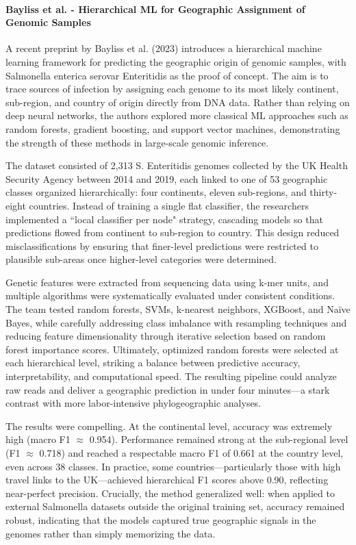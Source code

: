 \documentclass[twocolumn,10pt]{article}
\begin{document}
\paragraph{Bayliss et al. - Hierarchical ML for Geographic Assignment of Genomic Samples}

A recent preprint by Bayliss et al. (2023) \citep{bayliss2022hierarchical} introduces a hierarchical
machine learning framework for predicting the geographic origin of genomic samples, with Salmonella
enterica serovar Enteritidis as the proof of concept. The aim is to trace sources of infection by
assigning each genome to its most likely continent, sub-region, and country of origin directly from
DNA data. Rather than relying on deep neural networks, the authors explored more classical ML
approaches such as random forests, gradient boosting, and support vector machines, demonstrating the
strength of these methods in large-scale genomic inference.

The dataset consisted of 2,313 S. Enteritidis genomes collected by the UK Health Security Agency
between 2014 and 2019, each linked to one of 53 geographic classes organized hierarchically: four
continents, eleven sub-regions, and thirty-eight countries. Instead of training a single flat
classifier, the researchers implemented a ``local classifier per node" strategy, cascading models so
that predictions flowed from continent to sub-region to country. This design reduced
misclassifications by ensuring that finer-level predictions were restricted to plausible sub-areas
once higher-level categories were determined.

Genetic features were extracted from sequencing data using k-mer units, and multiple algorithms were
systematically evaluated under consistent conditions. The team tested random forests, SVMs,
k-nearest neighbors, XGBoost, and Naïve Bayes, while carefully addressing class imbalance with
resampling techniques and reducing feature dimensionality through iterative selection based on
random forest importance scores. Ultimately, optimized random forests were selected at each
hierarchical level, striking a balance between predictive accuracy, interpretability, and
computational speed. The resulting pipeline could analyze raw reads and deliver a geographic
prediction in under four minutes—a stark contrast with more labor-intensive phylogeographic
analyses.

The results were compelling. At the continental level, accuracy was extremely high (macro F1
$\approx$ 0.954). Performance remained strong at the sub-regional level (F1 $\approx$ 0.718) and
reached a respectable macro F1 of 0.661 at the country level, even across 38 classes. In practice,
some countries—particularly those with high travel links to the UK—achieved hierarchical F1 scores
above 0.90, reflecting near-perfect precision. Crucially, the method generalized well: when applied
to external Salmonella datasets outside the original training set, accuracy remained robust,
indicating that the models captured true geographic signals in the genomes rather than simply
memorizing the data.
\end{document}
